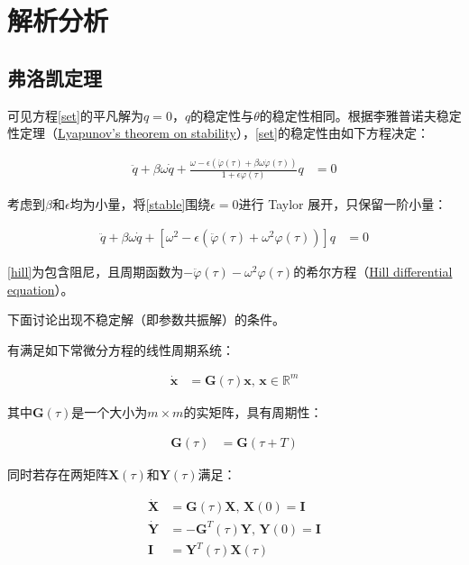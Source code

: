 \section{解析分析}

\subsection{弗洛凯定理}

可见方程\eqref{set}的平凡解为$q=0$，$q$的稳定性与$\theta$的稳定性相同。根据李雅普诺夫稳定性定理（\href{https://en.wikipedia.org/wiki/Lyapunov_stability}{Lyapunov's theorem on stability}）\cite{belyakov_nonlinear_2009}，\eqref{set}的稳定性由如下方程决定：

\begin{align}
    \ddot{q}+\beta\omega\dot{q}+\frac{\omega-\epsilon(\ddot{\varphi}(\tau)+\beta\omega\dot{\varphi}(\tau))}{1+\epsilon\varphi(\tau)}q &= 0 \label{stable}
\end{align}

考虑到$\beta$和$\epsilon$均为小量，将\eqref{stable}围绕$\epsilon=0$进行 Taylor 展开，只保留一阶小量：

\begin{align}
    \ddot{q}+\beta\omega\dot{q}+\left[\omega^{2}-\epsilon\left(\ddot{\varphi}(\tau)+\omega^{2}\varphi(\tau)\right)\right]q &=0 \label{hill}
\end{align}

\eqref{hill}为包含阻尼，且周期函数为$-\ddot{\varphi}(\tau)-\omega^{2}\varphi(\tau)$的希尔方程（\href{https://en.wikipedia.org/wiki/Hill_differential_equation}{Hill differential equation}）。

下面讨论\label{hill}出现不稳定解（即参数共振解）的条件。

有满足如下常微分方程的线性周期系统：

\begin{align}
    \dot{\mathbf{x}} &= \mathbf{G}(\tau)\mathbf{x},\,\mathbf{x}\in\mathbb{R}^{m} \label{sys}
\end{align}

其中$\mathbf{G}(\tau)$是一个大小为$m\times m$的实矩阵，具有周期性：

\begin{align}
    \mathbf{G}(\tau) &= \mathbf{G}(\tau+T)
\end{align}

同时若存在两矩阵$\mathbf{X}(\tau)$和$\mathbf{Y}(\tau)$满足：

\begin{align}
    \dot{\mathbf{X}} &= \mathbf{G}(\tau)\mathbf{X},\,\mathbf{X}(0)=\mathbf{I} \label{x} \\ 
    \dot{\mathbf{Y}} &= -\mathbf{G}^{T}(\tau)\mathbf{Y},\,\mathbf{Y}(0)=\mathbf{I} \label{y} \\
    \mathbf{I} &= \mathbf{Y}^{T}(\tau)\mathbf{X}(\tau) \label{xy}
\end{align}

